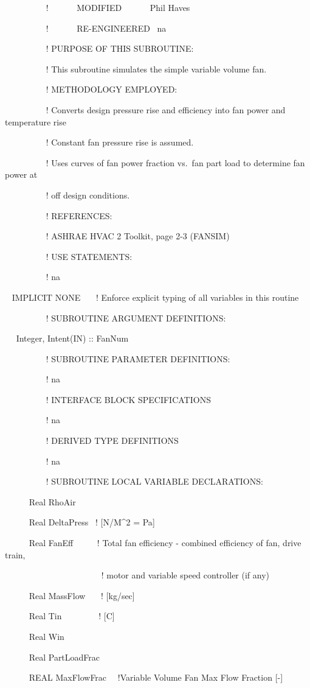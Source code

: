 ~~~~~~ ~~~!~~~~~~ MODIFIED~~~~~~ Phil Haves

~~~~~~~~~ !~~~~~~ RE-ENGINEERED~ na

~~~~~~~~~ ! PURPOSE OF THIS SUBROUTINE:

~~~~~~~~~ ! This subroutine simulates the simple variable volume fan.

~~~~~~~~~ ! METHODOLOGY EMPLOYED:

~~~~~~~~~ ! Converts design pressure rise and efficiency into fan power and temperature rise

~~~~~~~~~ ! Constant fan pressure rise is assumed.

~~~~~~~~~ ! Uses curves of fan power fraction vs.~fan part load to determine fan power at

~~~~~~~~~ ! off design conditions.

~~~~~~~~~ ! REFERENCES:

~~~~~~~~~ ! ASHRAE HVAC 2 Toolkit, page 2-3 (FANSIM)

~~~~~~~~~ ! USE STATEMENTS:

~~~~~~~~~ ! na

~ IMPLICIT NONE~~~ ! Enforce explicit typing of all variables in this routine

~~~~~~~~~ ! SUBROUTINE ARGUMENT DEFINITIONS:

~~ Integer, Intent(IN) :: FanNum

~~~~~~~~~ ! SUBROUTINE PARAMETER DEFINITIONS:

~~~~~~~~~ ! na

~~~~~~~~~ ! INTERFACE BLOCK SPECIFICATIONS

~~~~~~~~~ ! na

~~~~~~~~~ ! DERIVED TYPE DEFINITIONS

~~~~~~~~~ ! na

~~~~~~~~~ ! SUBROUTINE LOCAL VARIABLE DECLARATIONS:

~~~~~ Real RhoAir

~~~~~ Real DeltaPress~ ! {[}N/M\^{}2 = Pa{]}

~~~~~ Real FanEff~~~~~ ! Total fan efficiency - combined efficiency of fan, drive train,

~~~~~~~~~~~~~~~~~~~~~~ ! motor and variable speed controller (if any)

~~~~~ Real MassFlow~~~ ! {[}kg/sec{]}

~~~~~ Real Tin~~~~~~~~ ! {[}C{]}

~~~~~ Real Win

~~~~~ Real PartLoadFrac

~~~~~ REAL MaxFlowFrac~~ !Variable Volume Fan Max Flow Fraction {[}-{]}

